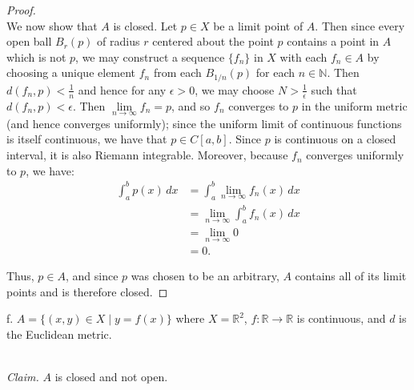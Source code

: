 \begin{proof}
    \ \\
    We now show that $A$ is closed. Let $p \in X$ be a limit point of $A$. Then since every open ball $B_r(p)$ of radius
    $r$ centered about the point $p$ contains a point in $A$ which is not $p$, we may construct a sequence 
    $\{ f_n \}$ in $X$ with each $f_n \in A$ by choosing a unique element $f_n$ from each $B_{1/n}(p)$ for each
    $n \in \mathbb{N}$. Then $d(f_n, p) < \frac{1}{n}$ and hence for any $\epsilon > 0$, we may choose 
    $N > \frac{1}{\epsilon}$ such that $d(f_n, p) < \epsilon$. Then $\lim\limits_{n \to \infty}{f_n} = p$, and so
    $f_n$ converges to $p$ in the uniform metric (and hence converges uniformly); since the uniform limit of continuous 
    functions is itself continuous, we have that $p \in C[a, b]$. Since $p$ is continuous on a closed interval, it is 
    also Riemann integrable. Moreover, because $f_n$ converges uniformly to $p$, we have:
    \begin{align*}
       \int_a^b{p(x) \,dx} &= \int_a^b{\lim\limits_{n \to \infty}{f_n(x)} \,dx} \\
                           &= \lim\limits_{n \to \infty}{\int_a^b{f_n(x) \,dx}} \\
                           &= \lim\limits_{n \to \infty}{0} \\
                           &= 0.
    \end{align*}

    Thus, $p \in A$, and since $p$ was chosen to be an arbitrary, $A$ contains all of its limit points and is therefore
    closed.
\end{proof}

\pagebreak

f.  $A = \{ (x, y) \in X \mid y = f(x) \}$ where $X = \mathbb{R}^2$, $f:\mathbb{R} \to \mathbb{R}$ is continuous, and 
    $d$ is the Euclidean metric.

\ \\
\emph{Claim.} $A$ is closed and not open.

